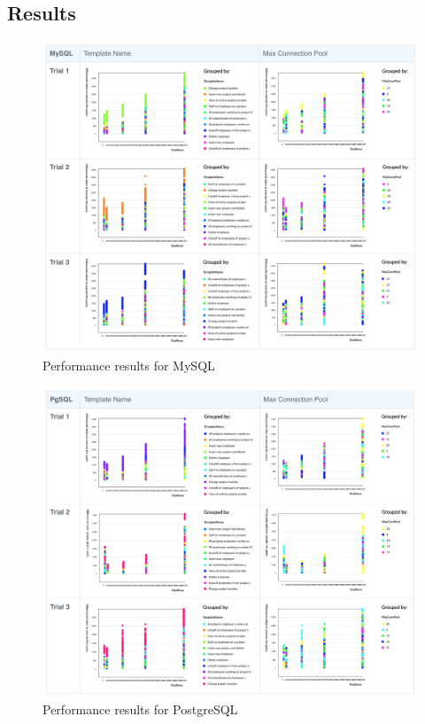 \documentclass[12pt]{report}
\begin{document}
\begin{spacing}{1.9}
	\section{Results}
	\begin{figure}[H]
		\centering
		\includegraphics[width=\textwidth]{MySQL.png}
		\caption{Performance results for MySQL}
		
	\end{figure}
	
	\begin{figure}[H]
		\centering
		\includegraphics[width=\textwidth]{PgSQL.png}
		\caption{Performance results for PostgreSQL}
		

\end{figure}
\end{spacing}
\end{document}
